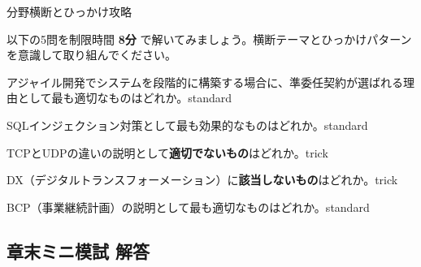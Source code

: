 \begin{minimoshi}{分野横断とひっかけ攻略}

以下の5問を制限時間 \textbf{8分} で解いてみましょう。横断テーマとひっかけパターンを意識して取り組んでください。

\begin{mondai}{アジャイル開発でシステムを段階的に構築する場合に、準委任契約が選ばれる理由として最も適切なものはどれか。}{standard}
\end{mondai}

\begin{mondai}{SQLインジェクション対策として最も効果的なものはどれか。}{standard}
\end{mondai}

\begin{mondai}{TCPとUDPの違いの説明として\textbf{適切でないもの}はどれか。}{trick}
\end{mondai}

\begin{mondai}{DX（デジタルトランスフォーメーション）に\textbf{該当しないもの}はどれか。}{trick}
\end{mondai}

\begin{mondai}{BCP（事業継続計画）の説明として最も適切なものはどれか。}{standard}
\end{mondai}

\end{minimoshi}

\subsection*{章末ミニ模試 解答}

